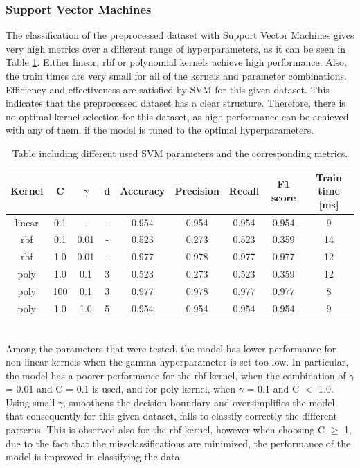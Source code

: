 \documentclass{article}
\begin{document}
\subsubsection*{Support Vector Machines}
The classification of the preprocessed dataset with Support Vector Machines gives very high metrics over a different range of hyperparameters, as it can be seen in Table \ref{table:votings_SVM}. Either linear, rbf or polynomial kernels achieve high performance. Also, the train times are very small for all of the kernels and parameter combinations. Efficiency and effectiveness are satisfied by SVM for this given dataset. This indicates that the preprocessed dataset has a clear structure. Therefore, there is no optimal kernel selection for this dataset, as high performance can be achieved with any of them, if the model is tuned to the optimal hyperparameters.
\begin{table}[h!]
\centering
\begin{tabular}{||c c c c c c c c c||} 
 \hline
 Kernel & C & $\gamma$ &d & Accuracy & Precision & Recall & F1 score & Train time [ms] \\ [0.5ex] 
 \hline\hline
 linear & 0.1 & - & - & 0.954 & 0.954 & 0.954 & 0.954 & 9 \\  
 rbf & 0.1 & 0.01 & - & 0.523 & 0.273 & 0.523 & 0.359 & 14 \\
 rbf & 1.0 & 0.01 & - & 0.977 & 0.978 & 0.977 & 0.977 & 12\\
 poly & 1.0 &  0.1 & 3 & 0.523 & 0.273 & 0.523 & 0.359 & 12 \\
 poly & 100 &  0.1 & 3 & 0.977 & 0.978 & 0.977 & 0.977 & 8 \\
 poly &  1.0&  1.0 & 5& 0.954 & 0.954 & 0.954 & 0.954 & 9 \\ [1ex] 
 \hline
\end{tabular}
\caption{Table including different used SVM parameters and the corresponding metrics.}
\label{table:votings_SVM}
\end{table}
\\
Among the parameters that were tested, the model has lower performance for non-linear kernels when the gamma hyperparameter is set too low. In particular, the model has a poorer performance for the rbf kernel, when the combination of $\gamma$ = 0.01 and C = 0.1 is used, and for poly kernel, when $\gamma$ = 0.1 and C $<$ 1.0. Using small $\gamma$, smoothens the decision boundary and oversimplifies the model that consequently for this given dataset, fails to classify correctly the different patterns. This is observed also for the rbf kernel, however when choosing C $\ge$ 1, due to the fact that the missclassifications are minimized, the performance of the model is improved in classifying the data. 
\end{document}
